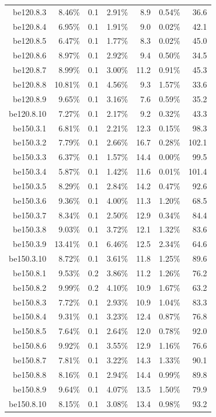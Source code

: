 \documentclass[pdflatex,sn-mathphys-num]{sn-jnl}%
\theoremstyle{thmstyleone}%
\theoremstyle{thmstyletwo}%
\theoremstyle{thmstylethree}%
\begin{document}
\begin{table}[h!]
\begin{tabular}{rrrrrrr}
		be120.8.3 &8.46\% &0.1 &2.91\% &8.9 &0.54\% &36.6  \\
		be120.8.4 &6.95\% &0.1 &1.91\% &9.0 &0.02\% &42.1  \\
		be120.8.5 &6.47\% &0.1 &1.77\% &8.3 &0.02\% &45.0  \\
		be120.8.6 &8.97\% &0.1 &2.92\% &9.4 &0.50\% &34.5  \\
		be120.8.7 &8.99\% &0.1 &3.00\% &11.2 &0.91\% &45.3  \\
		be120.8.8 &10.81\% &0.1 &4.56\% &9.3 &1.57\% &33.6  \\
		be120.8.9 &9.65\% &0.1 &3.16\% &7.6 &0.59\% &35.2  \\
		be120.8.10 &7.27\% &0.1 &2.17\% &9.2 &0.32\% &43.3  \\
		be150.3.1 &6.81\% &0.1 &2.21\% &12.3 &0.15\% &98.3  \\
		be150.3.2 &7.79\% &0.1 &2.66\% &16.7 &0.28\% &102.1  \\
		be150.3.3 &6.37\% &0.1 &1.57\% &14.4 &0.00\% &99.5  \\
		be150.3.4 &5.87\% &0.1 &1.42\% &11.6 &0.01\% &101.4  \\
		be150.3.5 &8.29\% &0.1 &2.84\% &14.2 &0.47\% &92.6  \\
		be150.3.6 &9.36\% &0.1 &4.00\% &11.3 &1.20\% &68.5  \\
		be150.3.7 &8.34\% &0.1 &2.50\% &12.9 &0.34\% &84.4  \\
		be150.3.8 &9.03\% &0.1 &3.72\% &12.1 &1.32\% &83.6  \\
		be150.3.9 &13.41\% &0.1 &6.46\% &12.5 &2.34\% &64.6  \\
		be150.3.10 &8.72\% &0.1 &3.61\% &11.8 &1.25\% &89.6  \\
		be150.8.1 &9.53\% &0.2 &3.86\% &11.2 &1.26\% &76.2  \\
		be150.8.2 &9.99\% &0.2 &4.10\% &10.9 &1.67\% &63.2  \\
		be150.8.3 &7.72\% &0.1 &2.93\% &10.9 &1.04\% &83.3  \\
		be150.8.4 &9.31\% &0.1 &3.23\% &12.4 &0.87\% &76.8  \\
		be150.8.5 &7.64\% &0.1 &2.64\% &12.0 &0.78\% &92.0  \\
		be150.8.6 &9.92\% &0.1 &3.55\% &12.9 &1.16\% &76.6  \\
		be150.8.7 &7.81\% &0.1 &3.22\% &14.3 &1.33\% &90.1  \\
		be150.8.8 &8.16\% &0.1 &2.94\% &14.4 &0.99\% &89.8  \\
		be150.8.9 &9.64\% &0.1 &4.07\% &13.5 &1.50\% &79.9  \\
		be150.8.10 &8.15\% &0.1 &3.08\% &13.4 &0.98\% &93.2  \\
		\bottomrule
	\end{tabular}
\end{table}		
\end{document}
